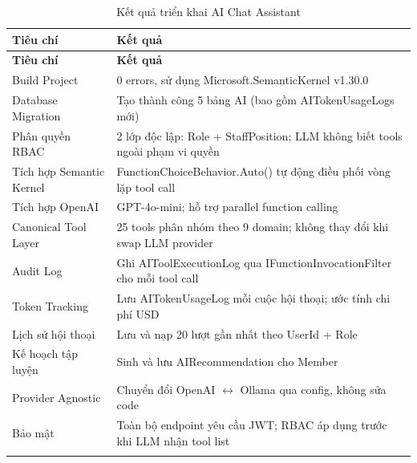 \begin{longtable}{|@{\hskip2pt}L{5cm}@{\hskip2pt}|
                  @{\hskip2pt}L{8cm}@{\hskip2pt}|}

\hline
\textbf{Tiêu chí} & \textbf{Kết quả} \\
\hline
\endfirsthead

\hline
\textbf{Tiêu chí} & \textbf{Kết quả} \\
\hline
\endhead

Build Project
& 0 errors, sử dụng Microsoft.SemanticKernel v1.30.0 \\
\hline

Database Migration
& Tạo thành công 5 bảng AI (bao gồm AITokenUsageLogs mới) \\
\hline

Phân quyền RBAC
& 2 lớp độc lập: Role + StaffPosition; LLM không biết tools ngoài phạm vi quyền \\
\hline

Tích hợp Semantic Kernel
& FunctionChoiceBehavior.Auto() tự động điều phối vòng lặp tool call \\
\hline

Tích hợp OpenAI
& GPT-4o-mini; hỗ trợ parallel function calling \\
\hline

Canonical Tool Layer
& 25 tools phân nhóm theo 9 domain; không thay đổi khi swap LLM provider \\
\hline

Audit Log
& Ghi AIToolExecutionLog qua IFunctionInvocationFilter cho mỗi tool call \\
\hline

Token Tracking
& Lưu AITokenUsageLog mỗi cuộc hội thoại; ước tính chi phí USD \\
\hline

Lịch sử hội thoại
& Lưu và nạp 20 lượt gần nhất theo UserId + Role \\
\hline

Kế hoạch tập luyện
& Sinh và lưu AIRecommendation cho Member \\
\hline

Provider Agnostic
& Chuyển đổi OpenAI $\leftrightarrow$ Ollama qua config, không sửa code \\
\hline

Bảo mật
& Toàn bộ endpoint yêu cầu JWT; RBAC áp dụng trước khi LLM nhận tool list \\
\hline

\caption{Kết quả triển khai AI Chat Assistant}
\label{tab:ai-result}

\end{longtable}


